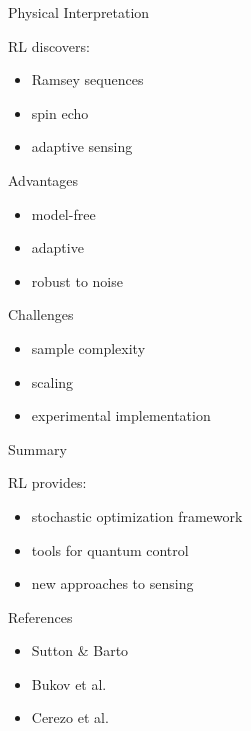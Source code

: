 \documentclass{beamer}
\begin{document}
\begin{frame}{Physical Interpretation}

  RL discovers:

  \begin{itemize}
  \item Ramsey sequences
  \item spin echo
  \item adaptive sensing
  \end{itemize}

\end{frame}

\begin{frame}{Advantages}

  \begin{itemize}
  \item model-free
  \item adaptive
  \item robust to noise
  \end{itemize}

\end{frame}

\begin{frame}{Challenges}

  \begin{itemize}
  \item sample complexity
  \item scaling
  \item experimental implementation
  \end{itemize}

\end{frame}

\begin{frame}{Summary}

  RL provides:

  \begin{itemize}
  \item stochastic optimization framework
  \item tools for quantum control
  \item new approaches to sensing
  \end{itemize}

\end{frame}

\begin{frame}{References}

  \begin{itemize}
  \item Sutton \& Barto
  \item Bukov et al.
  \item Cerezo et al.
  \end{itemize}

\end{frame}
\end{document}
